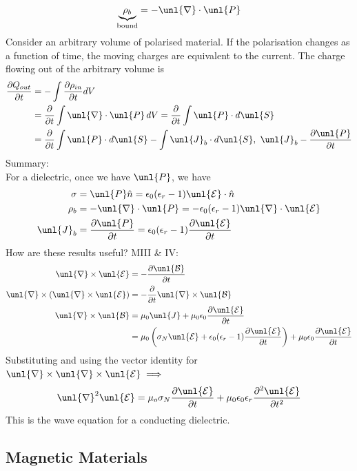 \documentclass[a4paper, 11pt, normalem]{report}
\newcommand\p{\partial}
\newcommand\E{\mathcal{E}}
\newcommand\uE{\unl{\E}}
\newcommand\B{\mathcal{B}}
\newcommand\uB{\unl{\B}}
\newcommand\del{\unl{\nabla}}
\newcommand\eno{\epsilon_0}
\newcommand\hn{\hat{n}}
\newcommand\J{\unl{J}}
\newcommand\er{\epsilon_r}
\begin{document}
\chapter{}
\begin{equation*}
    \underbrace{\rho_b}_{\text{bound}} = -\del\cdot\unl{P}
\end{equation*}
Consider an arbitrary volume of polarised material.
If the polarisation changes as a function of time, the moving charges are equivalent to the current.
The charge flowing out of the arbitrary volume is
\begin{align*}
    \frac{\p Q_{out}}{\p t} &= -\int \frac{\p \rho_{in}}{\p t}dV \\
    &= \frac{\p}{\p t} \int \del\cdot\unl{P}\,dV = \frac{\p}{\p t}\int \unl{P}\cdot d\unl{S} \\
    &= \frac{\p}{\p t} \int \unl{P} \cdot d\unl{S} - \int \J_b \cdot d\unl{S}, ~ \J_b - \frac{\p \unl{P}}{\p t}
\end{align*}
Summary: \\
For a dielectric, once we have $\unl{P}$, we have
\begin{align*}
    \sigma &= \unl{P}\hn = \eno(\er - 1)\uE\cdot \hn \\
    \rho_b &= -\del\cdot\unl{P} = -\eno(\er - 1)\del\cdot\uE \\
    \J_b &= \frac{\p \unl{P}}{\p t} = \eno(\er - 1)\frac{\p\uE}{\p t}
\end{align*}
How are these results useful? M\RN{3} \& \RN{4}:
\begin{align*}
    \del\times\uE &= -\frac{\p\uB}{\p t} \\
    \del\times(\del\times\uE) &= -\frac{\p}{\p t}\del\times\uB \\
    \del\times\uB &= \mu_0\J + \mu_0\eno\frac{\p \uE}{\p t} \\
    &=\mu_0\left(\sigma_N\uE + \eno(\er - 1)\frac{\p\uE}{\p t}\right) + \mu_0\eno\frac{\p \uE}{\p t}
\end{align*}
Substituting and using the vector identity for $\del\times\del\times\uE \implies$
\begin{equation}
    \del^2\uE = \mu_o\sigma_N \frac{\p\uE}{\p t} + \mu_0\eno\er\frac{\p^2\uE}{\p t^2}
\end{equation}
This is the wave equation for a conducting dielectric.

\section{Magnetic Materials}
\end{document}
